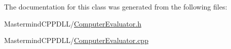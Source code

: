 The documentation for this class was generated from the following files\+:\begin{DoxyCompactItemize}
\item 
Mastermind\+C\+P\+P\+D\+L\+L/\hyperlink{_computer_evaluator_8h}{Computer\+Evaluator.\+h}\item 
Mastermind\+C\+P\+P\+D\+L\+L/\hyperlink{_computer_evaluator_8cpp}{Computer\+Evaluator.\+cpp}\end{DoxyCompactItemize}
